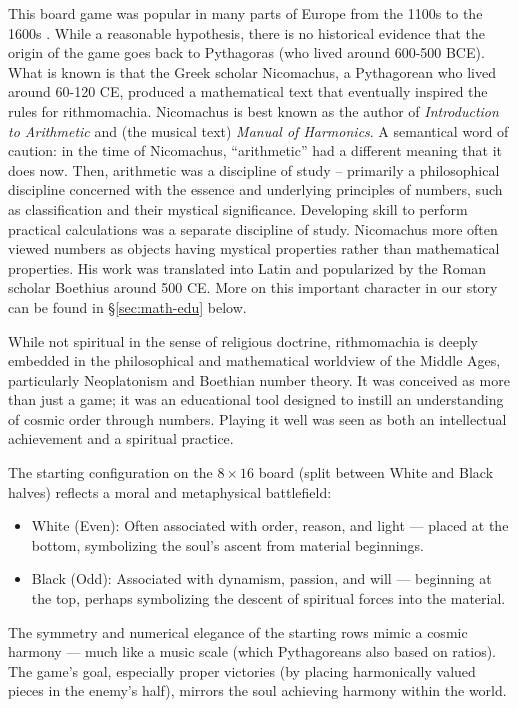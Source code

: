 \documentclass[12pt]{article}
\begin{document}
This board game was popular in many parts of Europe from the 1100s
to the 1600s \cite{Mo01}.
While a reasonable hypothesis, there is no historical
evidence that the origin of the game goes back to
Pythagoras (who lived around 600-500 BCE). What is
known is that the Greek scholar Nicomachus, a Pythagorean who
lived around 60-120 CE, produced a mathematical text that
eventually inspired the rules for rithmomachia. Nicomachus is best known as
the author of {\it Introduction to Arithmetic} and (the musical text)
{\it Manual of Harmonics}.
A semantical word of caution: in the time of Nicomachus,
``arithmetic'' had a different meaning that it does now.
Then, arithmetic was a discipline of study
-- primarily a philosophical discipline concerned with
the essence and underlying principles of numbers,
such as classification and their mystical significance.
Developing skill to perform practical calculations was a separate
discipline of study.
Nicomachus more often viewed numbers as objects having mystical
properties rather than mathematical properties. His work was
translated into Latin and popularized by the Roman scholar Boethius
around 500 CE. More on this important character in our story can be
found in \S \ref{sec:math-edu} below.

While not spiritual in the sense of religious doctrine, rithmomachia
is deeply embedded in the philosophical and mathematical
worldview of the Middle Ages, particularly Neoplatonism and Boethian
number theory. It was conceived as more than just a game; it was an
educational tool designed to instill an understanding of cosmic order
through numbers.
Playing it well was seen as both an intellectual achievement and
a spiritual practice.

The starting configuration on the $8\times 16$ board (split between White and
Black halves) reflects a
moral and metaphysical battlefield:
\begin{itemize}
\item
White (Even): Often associated with order, reason, and
light — placed at the bottom, symbolizing the soul's ascent from material
beginnings.
\item
Black (Odd): Associated with dynamism, passion, and will — beginning
at the top, perhaps symbolizing the descent of spiritual forces into the
material.
\end{itemize}
The symmetry and numerical elegance of the starting rows
mimic a cosmic harmony — much like a music scale (which Pythagoreans
also based on ratios). The game’s goal, especially proper victories
(by placing harmonically valued pieces in the enemy’s half), mirrors the soul
achieving harmony within the world.
\end{document}
